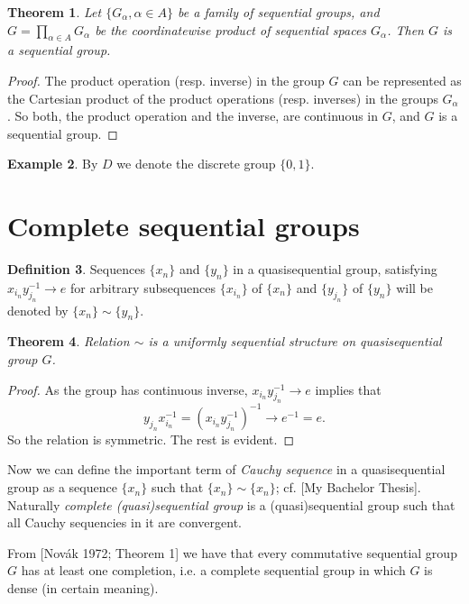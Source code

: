 \documentclass[12pt]{article}
\newtheorem{theorem}{Theorem}
\theoremstyle{definition}
\newtheorem{define}[theorem]{Definition}
\newtheorem{example}[theorem]{Example}
\theoremstyle{remark}
\begin{document}
\begin{theorem}\label{th:seqgrprod}
Let $\{G_\alpha, \alpha\in A\}$ be a family of sequential groups, and $G=\prod_{\alpha\in A}G_\alpha$ be the coordinatewise product of sequential spaces $G_\alpha$. Then $G$ is a sequential group.
\end{theorem}
\begin{proof}
The product operation (resp. inverse) in the group $G$ can be represented as the Cartesian product of the product operations (resp. inverses) in the groups $G_\alpha$. So both, the product operation and the inverse, are continuous in $G$, and $G$ is a sequential group.
\end{proof}


\begin{example}
By $D$ we denote the discrete group $\{0, 1\}$.
\end{example}

\section*{Complete sequential groups}

\begin{define}\label{def:unigr}
Sequences $\{x_n\}$ and $\{y_n\}$ in a quasisequential group, satisfying $x_{i_n}y_{j_n}^{-1}\to e$ for arbitrary subsequences $\{x_{i_n}\}$ of $\{x_n\}$ and $\{y_{j_n}\}$ of $\{y_n\}$ will be denoted by $\{x_n\}\sim\{y_n\}$.
\end{define}
\begin{theorem}\label{th:unigr}
Relation $\sim$ is a uniformly sequential structure on quasisequential group $G$.
\end{theorem}
\begin{proof}
As the group has continuous inverse, $x_{i_n}y_{j_n}^{-1}\to e$ implies that
\[
    y_{j_n}x_{i_n}^{-1} = (x_{i_n}y_{j_n}^{-1})^{-1} \to e^{-1} = e.
\]
So the relation is symmetric. The rest is evident.
\end{proof}

Now we can define the important term of \emph{Cauchy sequence} in a quasisequential group as a sequence $\{x_n\}$ such that $\{x_n\}\sim\{x_n\}$; cf. [My Bachelor Thesis]. Naturally \emph{complete (quasi)sequential group} is a (quasi)sequential group such that all Cauchy sequencies in it are convergent.

From [Novák 1972; Theorem 1] we have that every commutative sequential group $G$ has at least one completion, i.e. a complete sequential group in which $G$ is dense (in certain meaning).
\end{document}
